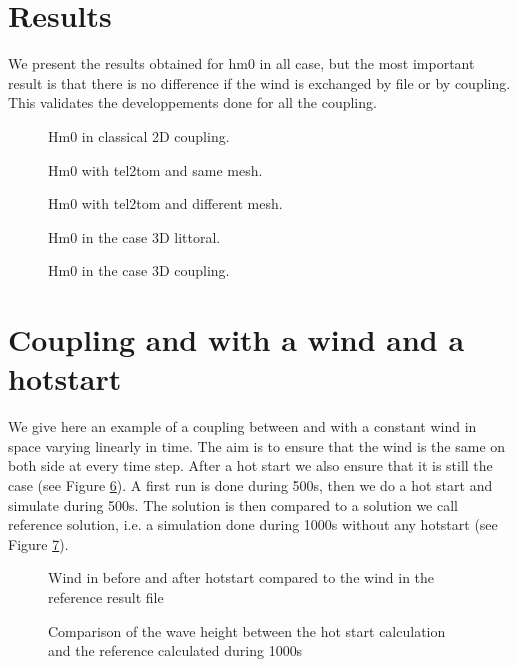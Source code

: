 \section{Results}
We present the results obtained for hm0 in all case, but the most important result
is that there is no difference if the wind is exchanged by file or by coupling.
This validates the developpements done for all the coupling.

\begin{figure} [!h]
\centering
{}
 \caption{Hm0 in classical 2D coupling.}
\label{hm0littoral2d}
\end{figure}

\begin{figure} [!h]
\centering
{}
 \caption{Hm0 with tel2tom and same mesh.}
\label{hm0same}
\end{figure}

\begin{figure} [!h]
\centering
{}
 \caption{Hm0 with tel2tom and different mesh.}
\label{hm0different}
\end{figure}

\begin{figure} [!h]
\centering
{}
 \caption{Hm0 in the case 3D littoral.}
\label{hm03dlittoral}
\end{figure}

\begin{figure} [!h]
\centering
{}
 \caption{Hm0 in the case 3D coupling.}
\label{hm03dcoupling}
\end{figure}


\section{Coupling  and \tomawac with a wind and a hotstart}
We give here an example of a coupling between  and \tomawac with a constant
wind in space varying linearly in time. The aim is to ensure that the wind is the same
on both side at every time step. After a hot start we also ensure that it is still the case
(see Figure \ref{windcouplinghotstart}).
A first run is done during 500s, then we do a hot start and simulate during 500s. The solution
is then compared to a solution we call reference solution, i.e. a simulation done during 1000s
without any hotstart (see Figure \ref{hm0couplinghotstart}).   
\begin{figure} [!h]
\centering
{}
 \caption{Wind in \tomawac before and after hotstart compared to the wind in the reference  result file}
\label{windcouplinghotstart}
\end{figure}

\begin{figure} [!h]
\centering
{}
\caption{Comparison of the  wave height between the hot start calculation and the reference
  calculated during 1000s}
\label{hm0couplinghotstart}
\end{figure}

